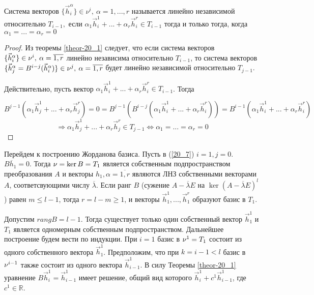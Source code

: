 \begin{definition}
	Система векторов $\{\vec{h}_i^{\alpha}\} \in \nu^i, \: \alpha = 1,...,r$ называется линейно  независимой относительно $T_{i - 1},$ если $\alpha_1 \vec{h}_i^1 + ... + \alpha_r \vec{h}_i^r \in T_{i-1}$ тогда и только тогда, когда $\alpha_1 = ... = \alpha_r = 0$
	\begin{proof}
		Из теоремы \ref{theor-20_1} следует, что если система векторов $\{\vec{h}_i^{\alpha}\} \in \nu^i, \: \alpha = \overline{1,r}$ линейно независима относительно $T_{i-1}$, то система векторов $\{\vec{h}_j^{\alpha} = B^{i-j} (\vec{h}^\alpha_i ) \} \in  \nu^j, \: \alpha = \overline{1,r}$ будет линейно независимой относительно $T_{j-1}.$
		
		Действительно, пусть вектор $\alpha_1 \vec{h}_i^1 + ... + \alpha_r \vec{h}_i^r \in T_{i-1}$. Тогда
		
		\[B^{j-1} (\alpha_1 \vec{h}_j^1 + ... + \alpha_r \vec{h}_j^r) = 0= B^{j - 1} ( B^{i - j} (\alpha_1 \vec{h}_i^1 + ... + \alpha_r \vec{h}_i^r)) = B^{i - 1}(\alpha_1 \vec{h}_i^1 + ... + \alpha_r \vec{h}_i^r)\] 
		\[\Rightarrow \alpha_1 \vec{h}_j^1 + ... + \alpha_r \vec{h}_j^r \in T_{j-1} \Leftrightarrow \alpha_1 = ... = \alpha_r = 0\]
	\end{proof}
\end{definition}

Перейдем к построению Жорданова базиса. Пусть в (\ref{20_7}) $i = 1, j = 0$. $B\overline{h}_1 = 0$. Тогда $\nu = \ker B = T_1$ является собственным подпространством преобразования $A$ и векторы $h_1, \alpha = \overline{1,r}$ являются ЛНЗ собственными векторами $A$, соответсвующими числу $\overline{\lambda}$. Если ранг $B$ (сужение $A - \overline{\lambda} E$ на $\ker (A - \overline{\lambda} E)^l$) равен $m \leqslant l - 1$, тогда $r = l - m \geqslant 1$, и векторы $\vec{h}_1^1, ... , \vec{h}_1^r$ образуют базис в $T_1$.

Допустим $rang B = l - 1$. Тогда существует только один собственный вектор $\vec{h}_1^1$ и $T_1$ является одномерным собственным подпространством. Дальнейшее построение будем вести по индукции. При $i = 1$ базис в $\nu^1 = T_1$ состоит из одного собственного вектора $\vec{h}_1^1$. Предположим, что при $k = i - 1 < l$ базис в $\nu^{i-1}$ также состоит из одного вектора $\vec{h}_{i - 1}^1$. В силу Теоремы \ref{theor-20_1} уравнение $B\vec{h}_i^1 = \vec{h}_{i-1}^1$ имеет решение, общий вид которого $\vec{h}_i^1 + c^1 \vec{h}_{i-1}^1$, где $c^1\in \mathbb{R}$.

